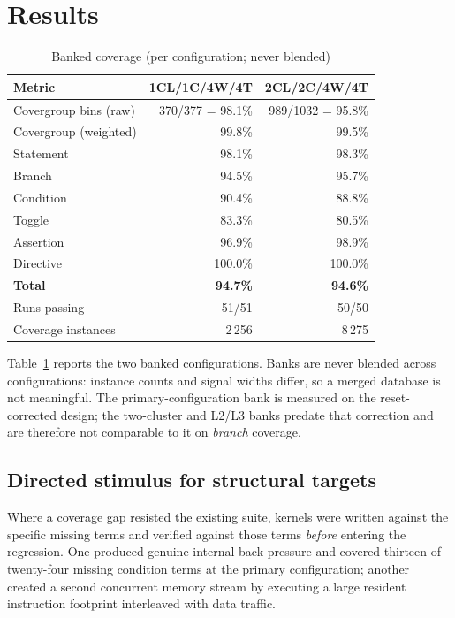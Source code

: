\documentclass[conference]{IEEEtran}
\begin{document}
\section{Results}
\label{sec:results}

\begin{table}[t]
\caption{Banked coverage (per configuration; never blended)}
\label{tab:fe-coverage}
\centering
\small
\begin{tabular}{lrr}
\toprule
Metric & 1CL/1C/4W/4T & 2CL/2C/4W/4T \\
\midrule
Covergroup bins (raw) & 370/377 = 98.1\% & 989/1032 = 95.8\% \\
Covergroup (weighted) & 99.8\% & 99.5\% \\
Statement & 98.1\% & 98.3\% \\
Branch & 94.5\% & 95.7\% \\
Condition & 90.4\% & 88.8\% \\
Toggle & 83.3\% & 80.5\% \\
Assertion & 96.9\% & 98.9\% \\
Directive & 100.0\% & 100.0\% \\
\midrule
\textbf{Total} & \textbf{94.7\%} & \textbf{94.6\%} \\
Runs passing & 51/51 & 50/50 \\
Coverage instances & 2\,256 & 8\,275 \\
\bottomrule
\end{tabular}
\end{table}

Table~\ref{tab:fe-coverage} reports the two banked configurations. Banks
are never blended across configurations: instance counts and signal widths
differ, so a merged database is not meaningful. The primary-configuration
bank is measured on the reset-corrected design; the two-cluster and L2/L3
banks predate that correction and are therefore not comparable to it on
\emph{branch} coverage.

\subsection{Directed stimulus for structural targets}
Where a coverage gap resisted the existing suite, kernels were written
against the specific missing terms and verified against those terms
\emph{before} entering the regression. One produced genuine internal
back-pressure and covered thirteen of twenty-four missing condition terms
at the primary configuration; another created a second concurrent memory
stream by executing a large resident instruction footprint interleaved with
data traffic.
\end{document}
